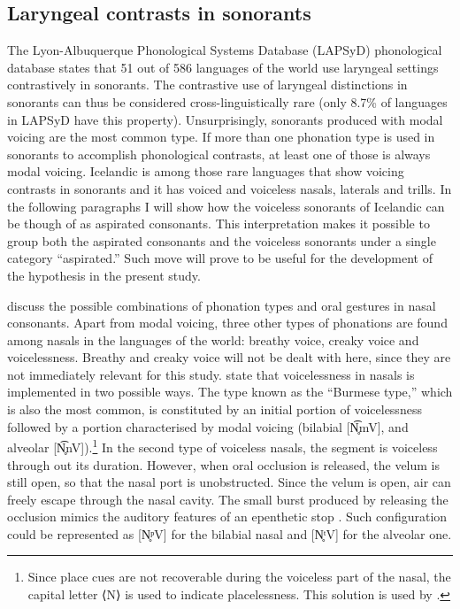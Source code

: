 \documentclass[11pt,a4paper,openany]{memoir}\usepackage[]{graphicx}\usepackage[]{color}
\begin{document}
\subsection{Laryngeal contrasts in sonorants}
The Lyon-Albuquerque Phonological Systems Database (LAPSyD) phonological data\-base \citep{Maddieson2012} states that 51 out of 586 languages of the world use laryngeal settings contrastively in sonorants.
The contrastive use of laryngeal distinctions in sonorants can thus be considered cross-linguistically rare (only 8.7\% of languages in LAPSyD have this property).
Unsurprisingly, sonorants produced with modal voicing are the most common type.
If more than one phonation type is used in sonorants to accomplish phonological contrasts, at least one of those is always modal voicing.
Icelandic is among those rare languages that show voicing contrasts in sonorants and it has voiced and voiceless nasals, laterals and trills.
In the following paragraphs I will show how the voiceless sonorants of Icelandic can be though of as aspirated consonants.
This interpretation makes it possible to group both the aspirated consonants and the voiceless sonorants under a single category ``aspirated.''
Such move will prove to be useful for the development of the hypothesis in the present study.

\citet{ladefoged1996} discuss the possible combinations of phonation types and oral gestures in nasal consonants.
Apart from modal voicing, three other types of phonations are found among nasals in the languages of the world: breathy voice, creaky voice and voicelessness.
Breathy and creaky voice will not be dealt with here, since they are not immediately relevant for this study.
\citet{bhaskararao1991} state that voicelessness in nasals is implemented in two possible ways.
The type known as the ``Burmese type,'' which is also the most common, is constituted by an initial portion of voicelessness followed by a portion characterised by modal voicing (bilabial [N̥͡mV], and alveolar [N̥͡nV]).\footnote{Since place cues are not recoverable during the voiceless part of the nasal, the capital letter ⟨N⟩ is used to indicate placelessness.
This solution is used by \citet{silverman2012}.
}
In the second type of voiceless nasals, the segment is voiceless through out its duration.
However, when oral occlusion is released, the velum is still open, so that the nasal port is unobstructed.
Since the velum is open, air can freely escape through the nasal cavity.
The small burst produced by releasing the occlusion mimics the auditory features of an epenthetic stop \citep[84]{bhaskararao1991}.
Such configuration could be represented as [N̥ᵖV] for the bilabial nasal and [N̥ᵗV] for the alveolar one.
\end{document}
